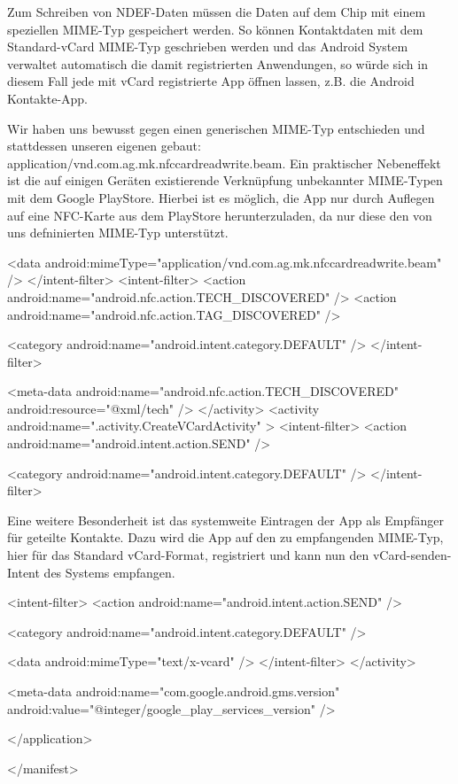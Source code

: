 \documentclass[a4paper,ngerman,12pt]{scrreprt}
\newcommand{\+}{\discretionary{\mbox{\scriptsize$\hookleftarrow$}}{}{}}
\begin{document}
Zum Schreiben von N\+D\+E\+F-\/\+Daten müssen die Daten auf dem Chip mit einem speziellen M\+I\+M\+E-\/\+Typ gespeichert werden. So können Kontaktdaten mit dem Standard-\/v\+Card M\+I\+M\+E-\/\+Typ geschrieben werden und das Android System verwaltet automatisch die damit registrierten Anwendungen, so würde sich in diesem Fall jede mit v\+Card registrierte App öffnen lassen, z.\+B. die Android Kontakte-\/\+App.

Wir haben uns bewusst gegen einen generischen M\+I\+M\+E-\/\+Typ entschieden und stattdessen unseren eigenen gebaut:  application/vnd.\+com.\+ag.\+mk.\+nfccardreadwrite.\+beam. Ein praktischer Nebeneffekt ist die auf einigen Geräten existierende Verknüpfung unbekannter M\+I\+M\+E-\/\+Typen mit dem Google Play\+Store. Hierbei ist es möglich, die App nur durch Auflegen auf eine N\+F\+C-\/\+Karte aus dem Play\+Store herunterzuladen, da nur diese den von uns defninierten M\+I\+M\+E-\/\+Typ unterstützt. \begin{DoxyVerb}                <data android:mimeType="application/vnd.com.ag.mk.nfccardreadwrite.beam" />
            </intent-filter>
            <intent-filter>
                <action android:name="android.nfc.action.TECH_DISCOVERED" />
                <action android:name="android.nfc.action.TAG_DISCOVERED" />

                <category android:name="android.intent.category.DEFAULT" />
            </intent-filter>

            <meta-data
                android:name="android.nfc.action.TECH_DISCOVERED"
                android:resource="@xml/tech" />
        </activity>
        <activity android:name=".activity.CreateVCardActivity" >
            <intent-filter>
                <action android:name="android.intent.action.SEND" />

                <category android:name="android.intent.category.DEFAULT" />
            </intent-filter>
\end{DoxyVerb}


Eine weitere Besonderheit ist das systemweite Eintragen der App als Empfänger für geteilte Kontakte. Dazu wird die App auf den zu empfangenden M\+I\+M\+E-\/\+Typ, hier für das Standard v\+Card-\/\+Format, registriert und kann nun den v\+Card-\/senden-\/\+Intent des Systems empfangen.

\begin{DoxyVerb}            <intent-filter>
                <action android:name="android.intent.action.SEND" />

                <category android:name="android.intent.category.DEFAULT" />

                <data android:mimeType="text/x-vcard" />
            </intent-filter>
        </activity>

        <meta-data
            android:name="com.google.android.gms.version"
            android:value="@integer/google_play_services_version" />

    </application>

</manifest>
\end{DoxyVerb}
\end{document}
